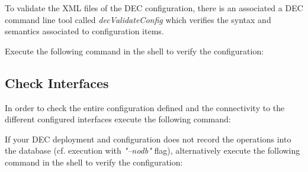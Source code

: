\documentclass[dec_sum_main.tex]{subfiles}
\begin{document}
To validate the XML files of the DEC configuration, there is an associated a DEC command line tool called \textit{decValidateConfig} which verifies the syntax and semantics associated to  configuration items. \newline

\par 
\noindent
Execute the following command in the shell to verify the configuration:

 \newline

\par 

\subsection{Check Interfaces}
\noindent
In order to check the entire configuration defined and the connectivity to the different configured interfaces execute the following command:

 \newline


\par 
\noindent
If your DEC deployment and configuration does not record the operations into the database (cf. execution with \textit{"--nodb"} flag), alternatively execute the following command in the shell to verify the configuration:

 \newline
\end{document}
